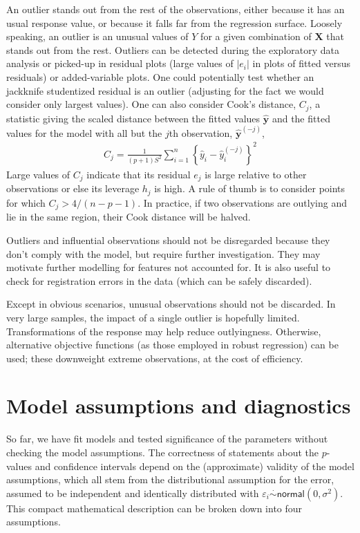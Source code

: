 \documentclass[
  11pt,
  letterpaper,
]{scrbook}
\theoremstyle{definition}
\theoremstyle{definition}
\theoremstyle{plain}
\theoremstyle{plain}
\theoremstyle{remark}
\begin{document}
An outlier stands out from the rest of the observations, either because
it has an usual response value, or because it falls far from the
regression surface. Loosely speaking, an outlier is an unusual values of
\(Y\) for a given combination of \(\mathbf{X}\) that stands out from the
rest. Outliers can be detected during the exploratory data analysis or
picked-up in residual plots (large values of \(|e_i|\) in plots of
fitted versus residuals) or added-variable plots. One could potentially
test whether an jackknife studentized residual is an outlier (adjusting
for the fact we would consider only largest values). One can also
consider Cook's distance, \(C_j\), a statistic giving the scaled
distance between the fitted values \(\hat{\boldsymbol{y}}\) and the
fitted values for the model with all but the \(j\)th observation,
\(\hat{\boldsymbol{y}}^{(-j)}\), \begin{align*}
C_j = \frac{1}{(p+1)S^2} \sum_{i=1}^n \left\{\hat{y}_i - \hat{y}_{i}^{(-j)}\right\}^2
\end{align*} Large values of \(C_j\) indicate that its residual \(e_j\)
is large relative to other observations or else its leverage \(h_j\) is
high. A rule of thumb is to consider points for which
\(C_j > 4/(n-p-1)\). In practice, if two observations are outlying and
lie in the same region, their Cook distance will be halved.

Outliers and influential observations should not be disregarded because
they don't comply with the model, but require further investigation.
They may motivate further modelling for features not accounted for. It
is also useful to check for registration errors in the data (which can
be safely discarded).

Except in obvious scenarios, unusual observations should not be
discarded. In very large samples, the impact of a single outlier is
hopefully limited. Transformations of the response may help reduce
outlyingness. Otherwise, alternative objective functions (as those
employed in robust regression) can be used; these downweight extreme
observations, at the cost of efficiency.

\section{Model assumptions and
diagnostics}\label{model-assumptions-and-diagnostics}

So far, we have fit models and tested significance of the parameters
without checking the model assumptions. The correctness of statements
about the \(p\)-values and confidence intervals depend on the
(approximate) validity of the model assumptions, which all stem from the
distributional assumption for the error, assumed to be independent and
identically distributed with
\(\varepsilon_i \stackrel{\cdot}{\sim} \mathsf{normal}(0, \sigma^2)\).
This compact mathematical description can be broken down into four
assumptions.
\end{document}
